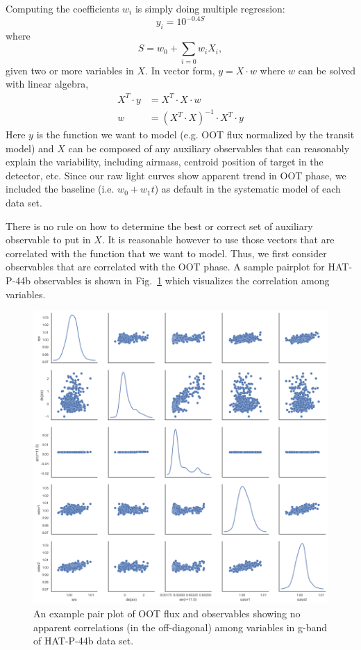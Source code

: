 Computing the coefficients $w_i$ is simply doing multiple regression:
$$
y_i=10^{-0.4S}
$$
where 
\begin{equation}
S=w_0+\sum_{i=0}w_iX_i,
\end{equation}
given two or more variables in $X$. In vector form, $y= X \cdot w$ where $w$ can be solved with linear algebra,
\begin{align}
X^T \cdot y& = X^T \cdot X \cdot w \\
w&=(X^T \cdot X)^{-1} \cdot X^T \cdot y 
\end{align}
Here $y$ is the function we want to model (e.g. OOT flux normalized by the transit model) and $X$ can be composed of any auxiliary observables that can reasonably explain the variability, including airmass, centroid position of target in the detector, etc. Since our raw light curves show apparent trend in OOT phase, we included the baseline (i.e. $w_0+w_1t$) as default in the systematic model of each data set. 

There is no rule on how to determine the best or correct set of auxiliary observable to put in $X$. It is reasonable however to use those vectors that are correlated with the function that we want to model. Thus, we first consider observables that are correlated with the OOT phase. A sample pairplot for HAT-P-44b observables is shown in Fig.~\ref{fig:pairplot} which visualizes the correlation among variables. 
\begin{figure}
\centering
\includegraphics[width=12cm]{figures/best_observables.png}
\caption{An example pair plot of OOT flux and observables showing no apparent correlations (in the off-diagonal) %
among variables in g-band of HAT-P-44b data set.}
\label{fig:pairplot}
\end{figure}

